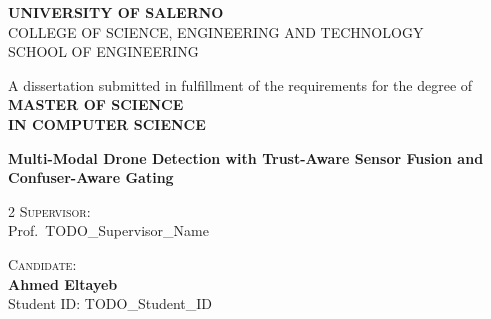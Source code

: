\documentclass[12pt,a4paper,oneside,openright]{book}
\begin{document}

\begin{titlepage}
\begin{center}
    \large{\textbf{UNIVERSITY OF SALERNO}}
    \vspace{3mm}
    \\ \large{COLLEGE OF SCIENCE, ENGINEERING AND TECHNOLOGY}
    \vspace{3mm}
    \\ \large{SCHOOL OF ENGINEERING}
    \vspace{5mm}
\end{center}


\begin{center}
    \vspace{10mm}
    \normalsize{A dissertation submitted in fulfillment of the requirements for the degree of}
    \vspace{2mm}
    \\ \large{\textbf{MASTER OF SCIENCE}}
    \\ \large{\textbf{IN COMPUTER SCIENCE}}
    \vspace{10mm}
\end{center}

\begin{center}
    \LARGE{\textbf{Multi-Modal Drone Detection with Trust-Aware Sensor Fusion and Confuser-Aware Gating}}
\end{center}

\vspace*{\fill}

\begin{minipage}[t]{1\textwidth}
    \begin{multicols}{2}
        {\normalsize{\textsc{Supervisor:}}{\normalsize\vspace{2mm}
        \\ \normalsize{Prof.\ TODO\_Supervisor\_Name}}} \\

         \columnbreak

         \begin{flushright}
            {\normalsize{\textsc{Candidate:}}{\normalsize\vspace{1mm}
            \\ \normalsize{\textbf{Ahmed Eltayeb}}\\
            \vspace{2mm}
            \normalsize{Student ID: TODO\_Student\_ID}}} \\
         \end{flushright}
    \end{multicols}
\end{minipage}


\end{titlepage}
\end{document}

